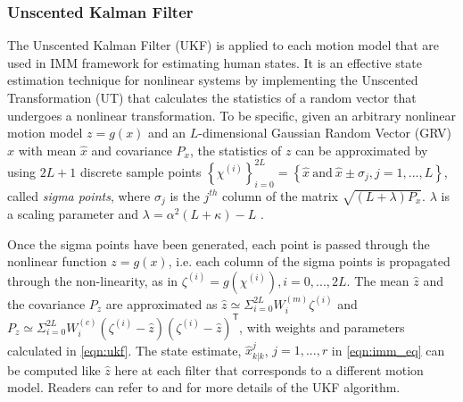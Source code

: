 \documentclass[journal]{IEEEtran}
\begin{document}
	\subsubsection{Unscented Kalman Filter}\label{subsec:UKF}
	The Unscented Kalman Filter (UKF) is applied to each motion model that are used in IMM framework for estimating human states. 
	It is an effective state estimation technique for nonlinear systems by implementing the Unscented Transformation (UT) that calculates the statistics of a random vector that undergoes a nonlinear transformation\cite {haykin2004kalman}.
	To be specific, given an arbitrary nonlinear motion model $z=g(x)$ and an $L$-dimensional Gaussian Random Vector (GRV) $x$ with mean $\hat{x}$ and covariance $P_x$, the statistics of $z$ can be approximated by using $2L+1$ discrete sample points $\left\{\chi^{(i)} \right\}_{i=0}^{2L}=\left\{ \hat{x}\ \text{and}\  \hat{x} \pm \sigma_j, j=1,...,L\right \}$, called \textit{sigma points}, where $\sigma_j$ is the $j^{th}$ column of the matrix $\sqrt{(L+\lambda)P_x}$. $\lambda$ is a scaling parameter and $\lambda=\alpha^2(L+\kappa)-L$  \cite{hong2013vehicle}.
	
	Once the sigma points have been generated, each point is passed through the nonlinear function $z=g(x)$, i.e. each column of the sigma points is propagated through the non-linearity, as in $\zeta^{(i)}=g(\chi^{(i)}), i=0,...,2L$. 
    The mean $\hat{z}$ and the covariance $P_z$ are approximated as $\hat{z}\simeq \Sigma_{i=0}^{2L}W_i^{(m)} \zeta^{(i)}$ and $P_z \simeq  \Sigma_{i=0}^{2L}W_i^{(c)}(\zeta^{(i)}-\hat{z})(\zeta^{(i)}-\hat{z})^\mathsf{T}$, with weights and parameters calculated in \cref{eqn:ukf}.
    The state estimate, $\hat{x}^j_{k|k}$, $j=1,...,r$ in \cref{eqn:imm_eq} can be computed like $\hat{z}$ here at each filter that corresponds to a different motion model. 
	Readers can refer to \cite {haykin2004kalman} and \cite {julier2004unscented} for more details of the UKF algorithm.
    
\end{document}
